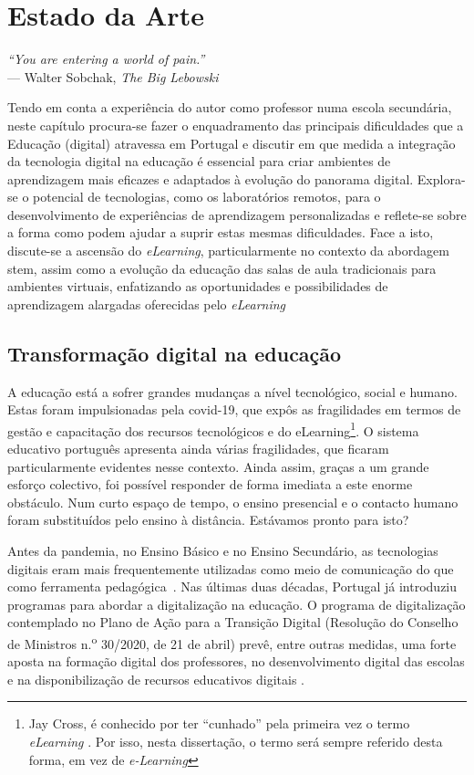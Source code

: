 \chapter{Estado da Arte}
\label{Capitulo2}

\begin{flushright}
\textit{``You are entering a world of pain.''} \\[0.5em]
--- Walter Sobchak, \textit{The Big Lebowski}
\end{flushright}
Tendo em conta a experiência do autor como professor numa escola secundária, neste capítulo procura-se fazer o enquadramento das principais dificuldades que a Educação (digital) atravessa em Portugal e discutir em que medida a integração da tecnologia digital na educação é essencial para criar ambientes de aprendizagem mais eficazes e adaptados à evolução do panorama digital. Explora-se o potencial de tecnologias, como os laboratórios remotos, para o desenvolvimento de experiências de aprendizagem personalizadas e reflete-se sobre a forma como podem ajudar a suprir estas mesmas dificuldades.
Face a isto, discute-se a ascensão do \textit{eLearning}, particularmente no contexto da abordagem \acrshort{stem}, assim como a evolução da educação das salas de aula tradicionais para ambientes virtuais, enfatizando as oportunidades e possibilidades de aprendizagem alargadas oferecidas pelo \textit{eLearning}

\section{Transformação digital na educação}
\label{sec:transformaçãodigital}
A educação está a sofrer grandes mudanças a nível tecnológico, social e humano. Estas foram impulsionadas pela \acrfull{covid-19}, que expôs as fragilidades em termos de gestão e capacitação dos recursos tecnológicos e do eLearning\footnote{Jay Cross, é conhecido por ter ``cunhado'' pela primeira vez o termo \textit{eLearning} \cite{jaycross}. Por isso, nesta dissertação, o termo será sempre referido desta forma, em vez de \textit{e-Learning}}. O sistema educativo português apresenta ainda várias fragilidades, que ficaram particularmente evidentes nesse contexto. Ainda assim, graças a um grande esforço colectivo, foi possível responder de forma imediata a este enorme obstáculo. Num curto espaço de tempo, o ensino presencial e o contacto humano foram substituídos pelo ensino à distância. Estávamos pronto para isto?

Antes da pandemia, no Ensino Básico e no Ensino Secundário, as tecnologias digitais eram mais frequentemente utilizadas como meio de comunicação do que como ferramenta pedagógica~\cite{oecd_using_2021}. Nas últimas duas décadas, Portugal já introduziu programas para abordar a digitalização na educação. O programa de digitalização contemplado no Plano de Ação para a Transição Digital (Resolução do Conselho de Ministros n.\textsuperscript{o} 30/2020, de 21 de abril) prevê, entre outras medidas, uma forte aposta na formação digital dos professores, no desenvolvimento digital das escolas e na disponibilização de recursos educativos digitais \cite{transicaodigital, capacitacaodigital}.

